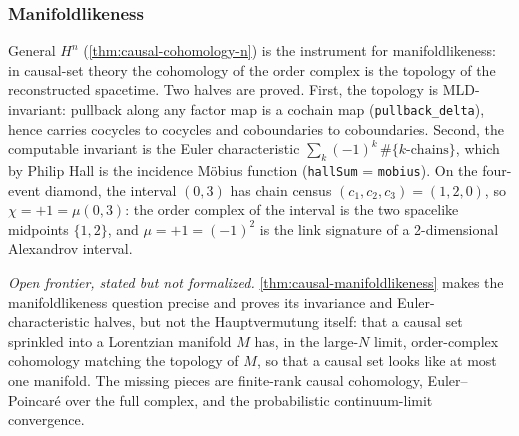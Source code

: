 \subsubsection{Manifoldlikeness}

\begin{theorem}\label{thm:causal-manifoldlikeness}\leanok{}
General $H^n$ (\cref{thm:causal-cohomology-n}) is the instrument for
manifoldlikeness: in causal-set theory the cohomology of the order complex is
the topology of the reconstructed spacetime. Two halves are proved. First, the
topology is MLD-invariant: pullback along any factor map is a cochain map
(\texttt{pullback\_delta}), hence carries cocycles to cocycles and
coboundaries to coboundaries. Second, the computable invariant is the Euler
characteristic $\sum_k (-1)^k\,\#\{k\text{-chains}\}$, which by Philip Hall is
the incidence M\"obius function (\texttt{hallSum} = \texttt{mobius}). On the
four-event diamond, the interval $(0,3)$ has chain census
$(c_1,c_2,c_3) = (1,2,0)$, so $\chi = +1 = \mu(0,3)$: the order complex of
the interval is the two spacelike midpoints $\{1,2\}$, and $\mu = +1 =
(-1)^2$ is the link signature of a 2-dimensional Alexandrov interval.
\end{theorem}

\begin{theorem}\label{thm:causal-set-hauptvermutung}\notready{}
\emph{Open frontier, stated but not formalized.}
\cref{thm:causal-manifoldlikeness} makes the manifoldlikeness question precise
and proves its invariance and Euler-characteristic halves, but not the
Hauptvermutung itself: that a causal set sprinkled into a Lorentzian manifold
$M$ has, in the large-$N$ limit, order-complex cohomology matching the topology
of $M$, so that a causal set looks like at most one manifold. The missing
pieces are finite-rank causal cohomology, Euler--Poincar\'e over the full
complex, and the probabilistic continuum-limit convergence.
\end{theorem}
